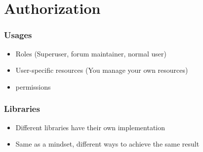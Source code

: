 \section{Authorization}

\frame{\tableofcontents[currentsection]}

\begin{frame}
    \frametitle{Usages}

    \begin{itemize}
        \item Roles (Superuser, forum maintainer, normal user)
        \item User-specific resources (You manage your own resources)
        \item permissions
    \end{itemize}
\end{frame}

\begin{frame}
    \frametitle{Libraries}

    \begin{itemize}
        \item Different libraries have their own implementation
        \item Same as a mindset, different ways to achieve the same result
    \end{itemize}
\end{frame}
